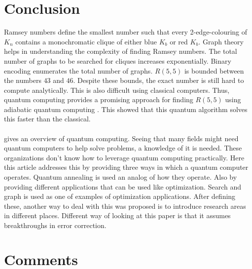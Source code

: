\documentclass{Assignment}
\begin{document}
\section{Conclusion}
Ramsey numbers define the smallest number such that every 2-edge-colouring of $K_n$ contains a monochromatic clique of either blue $K_b$ or red $K_b$.
Graph theory helps in understanding the complexity of finding Ramsey numbers.
The total number of graphs to be searched for cliques increases exponentially.
Binary encoding enumerates the total number of graphs.
$R(5,5)$ is bounded between the numbers $43$ and $46$.
Despite these bounds, the exact number is still hard to compute analytically.
This is also difficult using classical computers.
Thus, quantum computing provides a promising approach for finding $R(5,5)$ using adiabatic quantum computing \cite{PhysRevA.93.032301}.
This showed that this quantum algorithm solves this faster than the classical.
\\\\
\cite{rietsche2022quantum} gives an overview of quantum computing.
Seeing that many fields might need quantum computers to help solve problems, a knowledge of it is needed.
These organizations don’t know how to leverage quantum computing practically.
Here this article addresses this by providing three ways in which a quantum computer operates.
Quantum annealing is used an analog of how they operate.
Also by providing different applications that can be used like optimization.
Search and graph is used as one of examples of optimization applications.
After defining these, another way to deal with this was proposed is to introduce research areas in different places.
Different way of looking at this paper is that it assumes breakthroughs in error correction.
\newpage
\section*{Comments}
\end{document}
